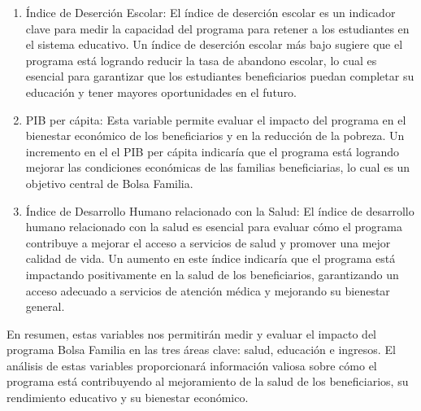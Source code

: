 \documentclass[
]{article}
\begin{document}
\begin{enumerate}
\def\labelenumi{\arabic{enumi}.}
\item
  Índice de Deserción Escolar: El índice de deserción escolar es un
  indicador clave para medir la capacidad del programa para retener a
  los estudiantes en el sistema educativo. Un índice de deserción
  escolar más bajo sugiere que el programa está logrando reducir la tasa
  de abandono escolar, lo cual es esencial para garantizar que los
  estudiantes beneficiarios puedan completar su educación y tener
  mayores oportunidades en el futuro.
\item
  PIB per cápita: Esta variable permite evaluar el impacto del programa
  en el bienestar económico de los beneficiarios y en la reducción de la
  pobreza. Un incremento en el el PIB per cápita indicaría que el
  programa está logrando mejorar las condiciones económicas de las
  familias beneficiarias, lo cual es un objetivo central de Bolsa
  Familia.
\item
  Índice de Desarrollo Humano relacionado con la Salud: El índice de
  desarrollo humano relacionado con la salud es esencial para evaluar
  cómo el programa contribuye a mejorar el acceso a servicios de salud y
  promover una mejor calidad de vida. Un aumento en este índice
  indicaría que el programa está impactando positivamente en la salud de
  los beneficiarios, garantizando un acceso adecuado a servicios de
  atención médica y mejorando su bienestar general.
\end{enumerate}

En resumen, estas variables nos permitirán medir y evaluar el impacto
del programa Bolsa Familia en las tres áreas clave: salud, educación e
ingresos. El análisis de estas variables proporcionará información
valiosa sobre cómo el programa está contribuyendo al mejoramiento de la
salud de los beneficiarios, su rendimiento educativo y su bienestar
económico.
\end{document}
